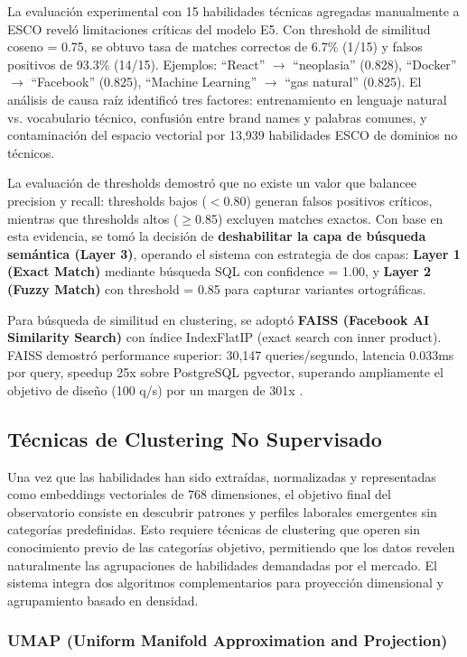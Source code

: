 La evaluación experimental con 15 habilidades técnicas agregadas manualmente a ESCO reveló limitaciones críticas del modelo E5. Con threshold de similitud coseno = 0.75, se obtuvo tasa de matches correctos de 6.7\% (1/15) y falsos positivos de 93.3\% (14/15). Ejemplos: ``React'' $\rightarrow$ ``neoplasia'' (0.828), ``Docker'' $\rightarrow$ ``Facebook'' (0.825), ``Machine Learning'' $\rightarrow$ ``gas natural'' (0.825). El análisis de causa raíz identificó tres factores: entrenamiento en lenguaje natural vs. vocabulario técnico, confusión entre brand names y palabras comunes, y contaminación del espacio vectorial por 13,939 habilidades ESCO de dominios no técnicos.

La evaluación de thresholds demostró que no existe un valor que balancee precision y recall: thresholds bajos ($<$0.80) generan falsos positivos críticos, mientras que thresholds altos ($\geq$0.85) excluyen matches exactos. Con base en esta evidencia, se tomó la decisión de \textbf{deshabilitar la capa de búsqueda semántica (Layer 3)}, operando el sistema con estrategia de dos capas: \textbf{Layer 1 (Exact Match)} mediante búsqueda SQL con confidence = 1.00, y \textbf{Layer 2 (Fuzzy Match)} con threshold = 0.85 para capturar variantes ortográficas.

Para búsqueda de similitud en clustering, se adoptó \textbf{FAISS (Facebook AI Similarity Search)} con índice IndexFlatIP (exact search con inner product). FAISS demostró performance superior: 30,147 queries/segundo, latencia 0.033ms por query, speedup 25x sobre PostgreSQL pgvector, superando ampliamente el objetivo de diseño (100 q/s) por un margen de 301x \cite{johnson2019}.

\subsection{Técnicas de Clustering No Supervisado}

Una vez que las habilidades han sido extraídas, normalizadas y representadas como embeddings vectoriales de 768 dimensiones, el objetivo final del observatorio consiste en descubrir patrones y perfiles laborales emergentes sin categorías predefinidas. Esto requiere técnicas de clustering que operen sin conocimiento previo de las categorías objetivo, permitiendo que los datos revelen naturalmente las agrupaciones de habilidades demandadas por el mercado. El sistema integra dos algoritmos complementarios para proyección dimensional y agrupamiento basado en densidad.

\subsubsection{UMAP (Uniform Manifold Approximation and Projection)}

